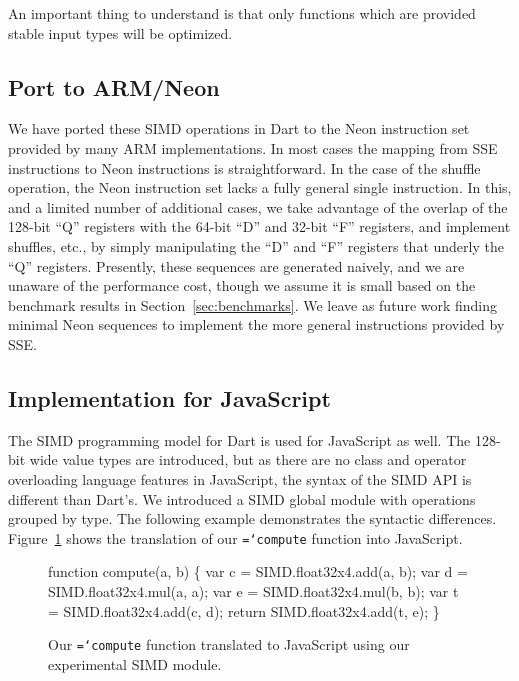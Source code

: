 \documentclass{sigplanconf}
\newcommand{\ttt}[1]{{\texttt{\hyphenchar\font=`\-\relax #1}}}%
\begin{document}
An important thing to understand is that only functions which are provided
stable input types will be optimized.

\subsection{Port to ARM/Neon}

We have ported these SIMD operations in Dart to the Neon instruction set
provided by many ARM implementations.
%
In most cases the mapping from SSE instructions to Neon instructions is
straightforward.
%
In the case of the shuffle operation, the Neon instruction set lacks a fully
general single instruction.
%
In this, and a limited number of additional cases, we take advantage of the
overlap of the 128-bit ``Q'' registers with the 64-bit ``D'' and 32-bit ``F''
registers, and implement shuffles, etc., by simply manipulating the ``D'' and
``F'' registers that underly the ``Q'' registers.
%
Presently, these sequences are generated naively, and we are unaware of the
performance cost, though we assume it is small based on the benchmark results
in Section~\ref{sec:benchmarks}.
%
We leave as future work finding minimal Neon sequences to implement the more
general instructions provided by SSE.


\subsection{Implementation for JavaScript}
\label{JS}

The SIMD programming model for Dart is used for JavaScript as well. The 128-bit
wide value types are introduced, but as there are no class and operator
overloading language features in JavaScript, the syntax of the SIMD API is
different than Dart's. We introduced a SIMD global module with operations
grouped by type. The following example demonstrates the syntactic differences.
Figure~\ref{fig:jssimd} shows the translation of our \ttt{compute} function
into JavaScript.

\begin{figure}
\begin{small}
\begin{program}[style=tt, number=true]
fu\tab{}nction compute(a, b) \{
  var c = SIMD.float32x4.add(a, b);
  var d = SIMD.float32x4.mul(a, a);
  var e = SIMD.float32x4.mul(b, b);
  var t = SIMD.float32x4.add(c, d);
  return SIMD.float32x4.add(t, e);\untab{}
\}
\end{program}
\end{small}
\caption{Our \ttt{compute} function translated to JavaScript using our
experimental SIMD module.}
\label{fig:jssimd}
\end{figure}
\end{document}
